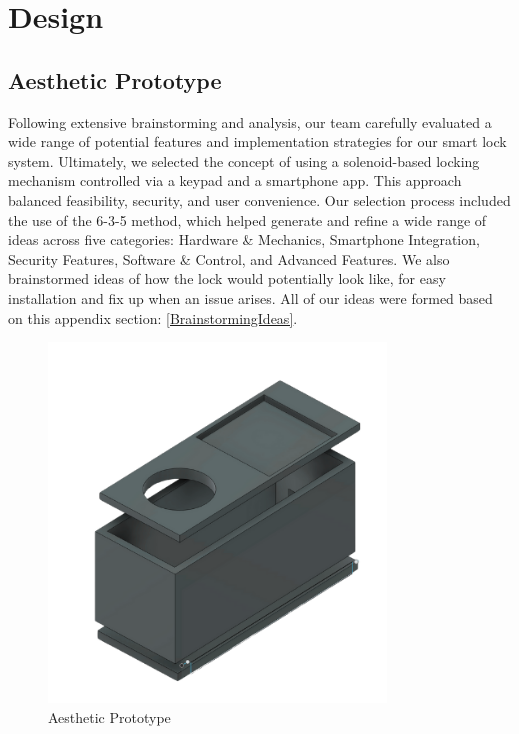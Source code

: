 \newpage

\section{Design}

\subsection{Aesthetic Prototype}

Following extensive brainstorming and analysis, our team carefully evaluated a wide range of potential features and implementation strategies for our smart lock system. Ultimately, we selected the concept of using a solenoid-based locking mechanism controlled via a keypad and a smartphone app. This approach balanced feasibility, security, and user convenience. Our selection process included the use of the 6-3-5 method, which helped generate and refine a wide range of ideas across five categories: Hardware \& Mechanics, Smartphone Integration, Security Features, Software \& Control, and Advanced Features. We also brainstormed ideas of how the lock would potentially look like, for easy installation and fix up when an issue arises. All of our ideas were formed based on this appendix section: \ref{BrainstormingIdeas}.

\begin{figure}[!ht]
    \centering
    \includegraphics[width=0.80\textwidth]{img/AestheticPrototype.png}
    \caption{Aesthetic Prototype}
    \label{fig:aestheticPrototype}
\end{figure}

